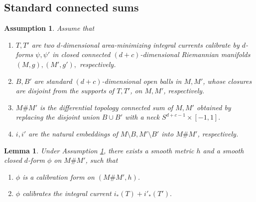 \documentclass[11pt,a4paper]{amsart}
\numberwithin{equation}{section}
\newcommand{\pf}{_\ast}
\theoremstyle{plain}
\newtheorem{lem}[exam]{Lemma}
\newtheorem{assump}[exam]{Assumption}
\theoremstyle{definition}
\numberwithin{equation}{subsection}
\begin{document}
	\subsection{Standard connected sums}
	\begin{assump}\label{assumpcsa}Assume that
		\begin{enumerate}
			\item $T,T'$ are two $d$-dimensional area-minimizing integral currents calibrate by $d$-forms $\psi,\psi'$ in closed connected $(d+c)$-dimensional Riemannian manifolds $(M,g),(M',g'),$ respectively. 
			\item $B,B'$ are	standard $(d+c)$-dimensional open balls in $M,M'$, whose closures are disjoint from the supports of $T,T'$, on $M,M'$, respectively.
			\item $M\# M'$ is the differential topology connected sum of $M,M'$ obtained by replacing the disjoint union $B\cup B'$ with a neck $S^{d+c-1}\times[-1,1].$
			\item $i,i'$ are the natural embeddings of $M\setminus B,M'\setminus B'$ into $M\# M'$, respectively.
	\end{enumerate}\end{assump}
	\begin{lem}\label{lemcsa}
		Under Assumption \ref{assumpcsa}, there exists a smooth metric $h$ and a smooth closed $d$-form $\phi$ on $M\# M'$, such that
		\begin{enumerate}
			\item $\phi$ is a calibration form on $(M\# M',h)$.
			\item $\phi$ calibrates the integral current $i\pf(T)+i'\pf(T').$
		\end{enumerate}
	\end{lem}
\end{document}
